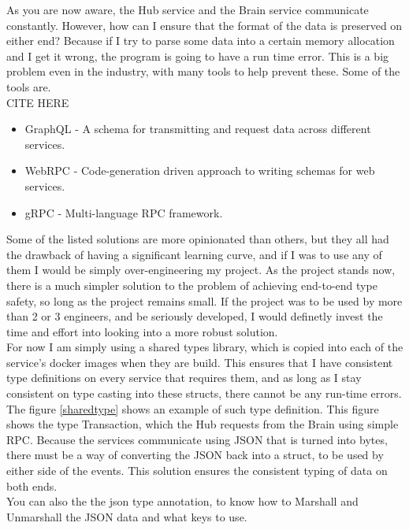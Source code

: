 \documentclass[titlepage]{article}
\begin{document}
As you are now aware, the Hub service and the Brain service communicate constantly. However, how can I ensure that the format of the data is preserved on either end? Because if I try to parse some data into a certain memory allocation and I get it wrong, the program is going to have a run time error. This is a big problem even in the industry, with many tools to help prevent these. Some of the tools are. \\

CITE HERE
\begin{itemize}
  \item GraphQL - A schema for transmitting and request data across different services.
  \item WebRPC - Code-generation driven approach to writing schemas for web services.
  \item gRPC - Multi-language RPC framework.
\end{itemize}

Some of the listed solutions are more opinionated than others, but they all had the drawback of having a significant learning curve, and if I was to use any of them I would be simply over-engineering my project. As the project stands now, there is a much simpler solution to the problem of achieving end-to-end type safety, so long as the project remains small. If the project was to be used by more than 2 or 3 engineers, and be seriously developed, I would definetly invest the time and effort into looking into a more robust solution. \\

For now I am simply using a shared types library, which is copied into each of the service's docker images when they are build. This ensures that I have consistent type definitions on every service that requires them, and as long as I stay consistent on type casting into these structs, there cannot be any run-time errors. The figure \ref{sharedtype} shows an example of such type definition. This figure shows the type Transaction, which the Hub requests from the Brain using simple RPC. Because the services communicate using JSON that is turned into bytes, there must be a way of converting the JSON back into a struct, to be used by either side of the events. This solution ensures the consistent typing of data on both ends. \\

You can also the the json type annotation, to know how to Marshall and Unmarshall the JSON data and what keys to use.
\end{document}
